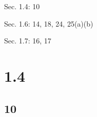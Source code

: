 






\begin{center}
\end{center}

Sec. 1.4: 10

Sec. 1.6: 14, 18, 24, 25(a)(b)

Sec. 1.7: 16, 17

\section*{1.4}

\subsection*{10}

